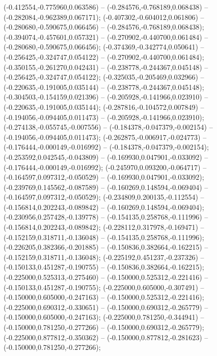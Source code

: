  (-0.412554,-0.775960,0.063586) -- (-0.284576,-0.768189,0.068438) -- (-0.282084,-0.962389,0.067171);
 (-0.407302,-0.604012,0.061806) -- (-0.280680,-0.590675,0.066456) -- (-0.284576,-0.768189,0.068438);
 (-0.394074,-0.457601,0.057321) -- (-0.270902,-0.440700,0.061484) -- (-0.280680,-0.590675,0.066456);
 (-0.374369,-0.342774,0.050641) -- (-0.256425,-0.324747,0.054122) -- (-0.270902,-0.440700,0.061484);
 (-0.350155,-0.261270,0.042431) -- (-0.238778,-0.244367,0.045148) -- (-0.256425,-0.324747,0.054122);
 (-0.325035,-0.205469,0.032966) -- (-0.220635,-0.191005,0.035144) -- (-0.238778,-0.244367,0.045148);
 (-0.304503,-0.154159,0.021396) -- (-0.205928,-0.141966,0.023910) -- (-0.220635,-0.191005,0.035144);
 (-0.287816,-0.104572,0.007849) -- (-0.194056,-0.094405,0.011473) -- (-0.205928,-0.141966,0.023910);
 (-0.274138,-0.055745,-0.007556) -- (-0.184378,-0.047379,-0.002154) -- (-0.194056,-0.094405,0.011473);
 (-0.262875,-0.006917,-0.024773) -- (-0.176444,-0.000149,-0.016992) -- (-0.184378,-0.047379,-0.002154);
 (-0.253592,0.042545,-0.043809) -- (-0.169930,0.047901,-0.033092) -- (-0.176444,-0.000149,-0.016992);
 (-0.245970,0.093200,-0.064717) -- (-0.164597,0.097312,-0.050529) -- (-0.169930,0.047901,-0.033092);
 (-0.239769,0.145562,-0.087589) -- (-0.160269,0.148594,-0.069404) -- (-0.164597,0.097312,-0.050529);
 (-0.234809,0.200135,-0.112554) -- (-0.156814,0.202243,-0.089842) -- (-0.160269,0.148594,-0.069404);
 (-0.230956,0.257428,-0.139778) -- (-0.154135,0.258768,-0.111996) -- (-0.156814,0.202243,-0.089842);
 (-0.228112,0.317978,-0.169471) -- (-0.152159,0.318711,-0.136048) -- (-0.154135,0.258768,-0.111996);
 (-0.226205,0.382366,-0.201885) -- (-0.150836,0.382664,-0.162215) -- (-0.152159,0.318711,-0.136048);
 (-0.225192,0.451237,-0.237326) -- (-0.150133,0.451287,-0.190755) -- (-0.150836,0.382664,-0.162215);
 (-0.225000,0.525313,-0.275460) -- (-0.150000,0.525312,-0.221416) -- (-0.150133,0.451287,-0.190755);
 (-0.225000,0.605000,-0.307491) -- (-0.150000,0.605000,-0.247163) -- (-0.150000,0.525312,-0.221416);
 (-0.225000,0.690312,-0.330651) -- (-0.150000,0.690312,-0.265779) -- (-0.150000,0.605000,-0.247163);
 (-0.225000,0.781250,-0.344941) -- (-0.150000,0.781250,-0.277266) -- (-0.150000,0.690312,-0.265779);
 (-0.225000,0.877812,-0.350362) -- (-0.150000,0.877812,-0.281623) -- (-0.150000,0.781250,-0.277266);
